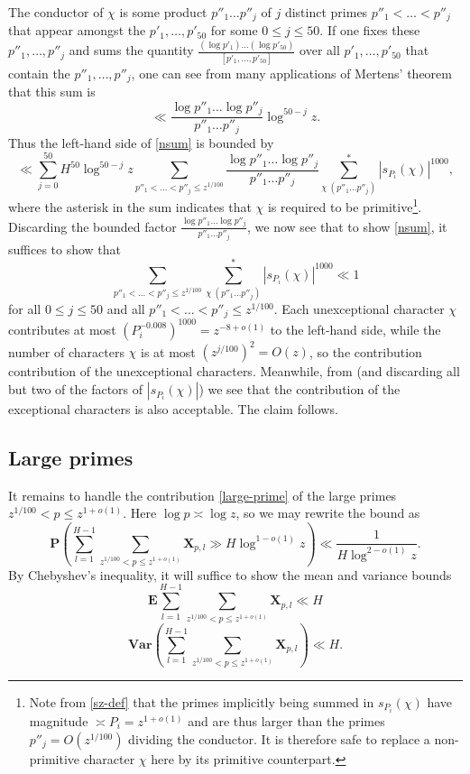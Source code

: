 \documentclass[12pt]{amsart}
\newcommand{\E}{\mathbf{E}}
\renewcommand{\P}{\mathbf{P}}
\newcommand{\Var}{\mathbf{Var}}
\begin{document}
The conductor of $\chi$ is some product $p''_1 \dots p''_j$ of $j$ distinct primes $p''_1 < \dots < p''_j$ that appear amongst the $p'_1,\dots,p'_{50}$ for some $0 \leq j \leq 50$.  If one fixes these $p''_1,\dots,p''_j$ and sums the quantity $\frac{(\log p'_1) \dots (\log p'_{50})}{[p'_1,\dots,p'_{50}]}$ over all $p'_1,\dots,p'_{50}$ that contain the $p''_1,\dots,p''_j$, one can see from many applications of Mertens' theorem that this sum is
$$ \ll \frac{\log p''_1 \dots \log p''_j}{p''_1 \dots p''_j} \log^{50-j} z.$$
Thus the left-hand side of \eqref{nsum} is bounded by
$$ \ll \sum_{j=0}^{50} H^{50} \log^{50-j} z \sum_{p''_1 < \dots < p''_j \leq z^{1/100}} \frac{\log p''_1 \dots \log p''_j}{p''_1 \dots p''_j} \sum_{\chi\ (p''_1 \dots p''_j)}^* |s_{P_i}(\chi)|^{1000},$$
where the asterisk in the sum indicates that $\chi$ is required to be primitive\footnote{Note from \eqref{sz-def} that the primes implicitly being summed in $s_{P_i}(\chi)$ have magnitude $\asymp P_i = z^{1+o(1)}$ and are thus larger than the primes $p''_j = O(z^{1/100})$ dividing the conductor.  It is therefore safe to replace a non-primitive character $\chi$ here by its primitive counterpart.}.  Discarding the bounded factor
$\frac{\log p''_1 \dots \log p''_j}{p''_1 \dots p''_j}$, we now see that to show \eqref{nsum}, it suffices to show that
$$\sum_{p''_1 < \dots < p''_j \leq z^{1/100}} \sum_{\chi\ (p''_1 \dots p''_j)}^* |s_{P_i}(\chi)|^{1000} \ll 1$$
for all $0 \leq j \leq 50$ and all $p''_1 < \dots < p''_j \leq z^{1/100}$.  Each unexceptional character $\chi$ contributes at most $(P_i^{-0.008})^{1000} = z^{-8+o(1)}$ to the left-hand side, while the number of characters $\chi$ is at most $(z^{j/100})^2 = O(z)$, so the contribution contribution of the unexceptional characters.  Meanwhile, from  (and discarding all but two of the factors of $|s_{P_i}(\chi)|$) we see that the contribution of the exceptional characters is also acceptable.  The claim follows.

\subsection{Large primes}

It remains to handle the contribution \eqref{large-prime} of the large primes $z^{1/100} < p \leq z^{1+o(1)}$.  Here $\log p \asymp \log z$, so we may rewrite the bound as
$$ \P \left( \sum_{l=1}^{H-1} \sum_{z^{1/100} < p \leq z^{1+o(1)}} \mathbf{X}_{p,l} \gg H \log^{1-o(1)} z \right) \ll \frac{1}{H \log^{2-o(1)} z}.
$$
By Chebyshev's inequality, it will suffice to show the mean and variance bounds
\begin{equation}\label{mean}
    \E \sum_{l=1}^{H-1} \sum_{z^{1/100} < p \leq z^{1+o(1)}} \mathbf{X}_{p,l} \ll H
\end{equation}
\begin{equation}\label{var}
    \Var \left( \sum_{l=1}^{H-1} \sum_{z^{1/100} < p \leq z^{1+o(1)}} \mathbf{X}_{p,l} \right) \ll H.
\end{equation}
\end{document}
